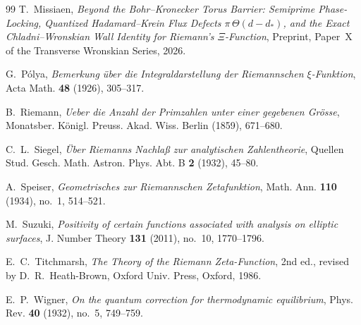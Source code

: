 \documentclass[11pt,reqno]{amsart}
\theoremstyle{definition}
\theoremstyle{remark}
\numberwithin{equation}{section}
\begin{document}
\begin{thebibliography}{99}
T.~Missiaen,
\emph{Beyond the Bohr--Kronecker Torus Barrier: Semiprime Phase-Locking, Quantized Hadamard--Krein Flux Defects $\pi\,\Theta(d - d_*)$, and the Exact Chladni--Wronskian Wall Identity for Riemann's $\Xi$-Function},
Preprint, Paper~X of the Transverse Wronskian Series, 2026.

G.~P\'olya,
\emph{Bemerkung \"uber die Integraldarstellung der Riemannschen $\xi$-Funktion},
Acta Math. \textbf{48} (1926), 305--317.

B.~Riemann,
\emph{Ueber die Anzahl der Primzahlen unter einer gegebenen Gr\"osse},
Monatsber. K\"onigl. Preuss. Akad. Wiss. Berlin (1859), 671--680.

C.~L.~Siegel,
\emph{\"Uber Riemanns Nachla\ss{} zur analytischen Zahlentheorie},
Quellen Stud. Gesch. Math. Astron. Phys. Abt. B \textbf{2} (1932), 45--80.

A.~Speiser,
\emph{Geometrisches zur Riemannschen Zetafunktion},
Math. Ann. \textbf{110} (1934), no.~1, 514--521.

M.~Suzuki,
\emph{Positivity of certain functions associated with analysis on elliptic surfaces},
J. Number Theory \textbf{131} (2011), no.~10, 1770--1796.

E.~C.~Titchmarsh,
\emph{The Theory of the Riemann Zeta-Function},
2nd ed., revised by D.~R.~Heath-Brown, Oxford Univ. Press, Oxford, 1986.

E.~P.~Wigner,
\emph{On the quantum correction for thermodynamic equilibrium},
Phys. Rev. \textbf{40} (1932), no.~5, 749--759.

\end{thebibliography}
\end{document}
